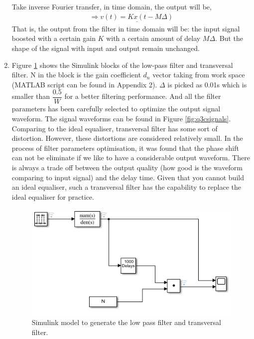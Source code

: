 \documentclass[11pt]{article}
\begin{document}
\begin{enumerate}[label=(\alph*)]
Take inverse Fourier transfer, in time domain, the output will be,
\begin{align*}
\Rightarrow \underline{ v(t)=Kx(t-M \Delta) }
\end{align*}
That is, the output from the filter in time domain will be: the input signal boosted with a certain gain $K$ with a certain amount of delay $M\Delta$. But the shape of the signal with input and output remain unchanged. 
\item Figure \ref{fig:q3cblocks} shows the Simulink blocks of the low-pass filter and transversal filter. N in the block is the gain coefficient $d_n$ vector taking from work space (MATLAB script can be found in Appendix 2). $\Delta$ is picked as 0.01s which is smaller than $\dfrac{0.5}{W}$ for a better filtering performance. And all the filter parameters has been carefully selected to optimize the output signal waveform. The signal waveforms can be found in Figure \ref{fig:q3csignals}. Comparing to the ideal equaliser, transversal filter has some sort of distortion. However, these distortions are considered relatively small. In the process of filter parameters optimisation, it was found that the phase shift can not be eliminate if we like to have a considerable output waveform. There is always a trade off between the output quality (how good is the waveform comparing to input signal) and the delay time. Given that you cannot build an ideal equaliser, such a transversal filter has the capability to replace the ideal equaliser for practice. 
    \begin{figure}[H]
    \centering 
        \includegraphics[scale=0.9]{Q3cblocks.PNG}
        \caption{\label{fig:q3cblocks}Simulink model to generate the low pass filter and transversal filter.}
    \end{figure}
    

\end{enumerate}
\end{document}
